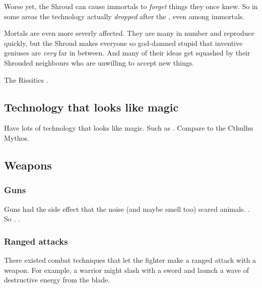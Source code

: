 Worse yet, the Shroud can cause immortals to \emph{forget} things they once knew. 
So in some areas the technology actually \emph{dropped} after the \secondbanewar, even among immortals. 

Mortals are even more severly affected. 
They are many in number and reproduce quickly, but the Shroud makes everyone so god-damned stupid that inventive geniuses are \emph{very} far in between. 
And many of their ideas get squashed by their Shrouded neighbours who are unwilling to accept new things. 

The Rissitics .









\subsection{Technology that looks like magic}
Have lots of technology that looks like magic. 
Such as .
Compare to the Cthulhu Mythos. 









\subsection{Weapons}





\subsubsection{Guns}
Guns had the side effect that the noise (and maybe smell too) scared animals. 
.
So .
\Murocs {}.  





\subsubsection{Ranged \melee attacks}
There existed combat techniques that let the fighter make a ranged attack with a \melee weapon. 
For example, a warrior might slash with a sword and launch a wave of destructive energy from the blade. 

